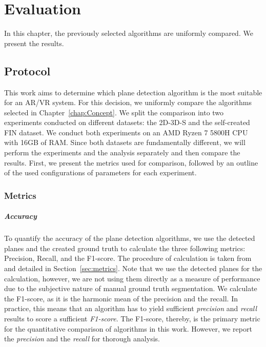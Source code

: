 \documentclass[main.tex]{subfiles}
\begin{document}
\chapter{Evaluation}
In this chapter, the previously selected algorithms are uniformly compared. We present the results.
\section{Protocol}

This work aims to determine which plane detection algorithm is the most suitable for an AR/VR system. For this decision, we uniformly compare the algorithms selected in
Chapter~\ref{chap:Concept}. We split the comparison into two experiments conducted on different datasets: the 2D-3D-S and the
self-created FIN dataset.
We conduct both experiments on an AMD Ryzen 7 5800H CPU with 16GB of RAM.
Since both datasets are fundamentally different, we will perform the experiments and the analysis separately and then compare the results.
First, we present the metrics used for comparison, followed by an outline of the used configurations of parameters for each experiment.

\subsection{Metrics}
\label{subsec:metrics}
\paragraph{Accuracy}
To quantify the accuracy of the plane detection algorithms, we use the detected planes and the created ground truth to calculate the three following
metrics: Precision, Recall, and the F1-score.
The procedure of calculation is taken from~\cite[Section~4]{Araújo_Oliveira_2020} and detailed in Section~\ref{sec:metrics}.
Note that we use the detected planes for the calculation, however, we are not using them directly as a measure of performance due to the subjective
nature of manual ground truth segmentation.
We calculate the F1-score, as it is the harmonic mean of the precision and the recall. In practice, this means that an algorithm
has to yield sufficient \textit{precision} and \textit{recall} results to score a sufficient \textit{F1-score}. The F1-score, thereby, is the primary metric
for the quantitative comparison of algorithms in this work. However, we report the \textit{precision} and the \textit{recall} for thorough analysis.
\end{document}
